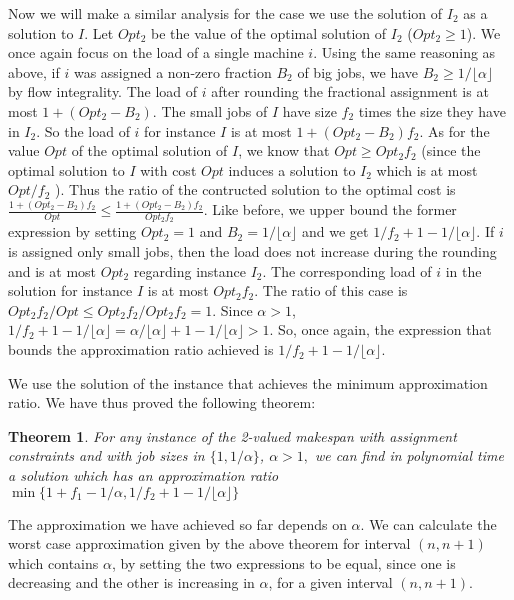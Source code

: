 \documentclass[11pt]{article}\usepackage{amsmath}
\newtheorem{theorem}{Theorem}[section]
\begin{document}
Now we will make a similar analysis for the case we use the solution
of $I_2$ as a solution to $I$. Let $Opt_2$ be the value of the optimal
solution of $I_2$ ($Opt_2 \geq 1$). We once again focus on the load of a
single machine $i$. Using the same reasoning as above, if $i$ was assigned a non-zero fraction $B_2$ of  big jobs, we have $B_2 \geq 1/\lfloor \alpha  \rfloor$ by flow integrality. The load of $i$
after rounding the fractional assignment is at most $1+(Opt_2-B_2)$. The
small jobs of $I$ have size $f_2$ times the size they have in
$I_2$. So the load of $i$ for instance $I$ is at most
$1+(Opt_2-B_2)f_2$. As for the value  $Opt$ of the optimal solution of $I$, we know that $Opt \geq Opt_2 f_2$ (since the optimal solution to $I$ with cost $Opt$ induces a solution to $I_2$ which is at most $Opt/f_2$ ). Thus the ratio of the contructed solution to the optimal cost is $\frac{1+(Opt_2-B_2)  f_2}{Opt} \leq \frac{1+(Opt_2-B_2) f_2}{Opt_2 f_2}$. Like before, we upper bound the former expression by setting $Opt_2=1$ and $B_2=1/\lfloor \alpha  \rfloor$ and we get $1/f_2+1-1/\lfloor \alpha  \rfloor$. If $i$ is assigned only small jobs, then the load does not increase during the rounding and is at most $Opt_2$ regarding instance $I_2$. The corresponding load of $i$ in the solution for instance $I$ is at most $Opt_2f_2$. The ratio of this case is $Opt_2f_2/Opt \leq Opt_2f_2/Opt_2f_2=1$. Since $\alpha >1$, $1/f_2+1-1/\lfloor \alpha  \rfloor= \alpha/\lfloor \alpha  \rfloor+1-1/\lfloor \alpha  \rfloor > 1$. So, once again, the expression that bounds the approximation ratio achieved is $1/f_2+1-1/\lfloor \alpha  \rfloor$.

We use the solution of the instance that achieves the minimum approximation ratio. We have thus proved the following theorem:

\begin{theorem}
For any instance of the 2-valued makespan with assignment constraints
and with job sizes in $\{ 1, 1/\alpha  \}$, $\alpha  >1,$ we can find in polynomial time a solution which has an approximation ratio $\min \{1+f_1-1/\alpha,1/f_2+1-1/\lfloor \alpha  \rfloor \}$
\end{theorem}

The approximation we have achieved so far depends on $\alpha$. We can calculate  
 the worst case approximation given by the above theorem for interval $(n,n+1)$ which contains $\alpha$, by setting the two expressions to be equal, since one is decreasing  and the other is increasing in $\alpha$, for a given interval $(n,n+1)$.
\end{document}
